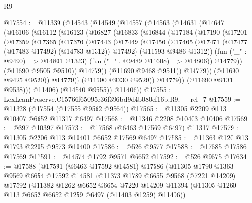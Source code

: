\begin{lexlean}{R9}
\begin{coremodule}
@17554 := @11339
    (@14543
      (@14549
        (@14557
          (@14563
            (@14631
              (@14647
                (@16106
                  (@16112
                    (@16123
                      (@16827
                        (@16833
                          (@16844
                            (@17184
                              (@17190
                                (@17201
                                  (@17359
                                    (@17365
                                      (@17376
                                        (@17443
                                          (@17449
                                            (@17456
                                              (@17465
                                                (@17471
                                                  (@17477 (@17483 @17492) (@14783 @1312))
                                                  @17492)
                                                (@11593 @9486 @1312))
                                              (fun ("_" : @9490) => @14801 @1323)
                                              (fun ("_" : @9489 @11608) => @14806))
                                            @14779))
                                        (@11690 @9505 @9510))
                                      @14779))
                                  (@11690 @9468 @9511))
                                @14779))
                            (@11690 @9425 @9520))
                          @14779))
                      (@11690 @9330 @9529))
                    @14779))
                (@11690 @9131 @9538)))
            @11406)
          (@14540 @9555))
        @11406))
@17555 := LexLeanPreserve.C15766f65095e36f396bd9d4b080ef16b.R9.__rel_7
@17559 := @11328 (@17554 (@17555 @9562 @9564))
@17565 := @11305 @2209 @113 @10407 @6652 @11317 @6497
@17568 := @11346 @2208 @10403 @10406
@17569 := @397 @10397
@17573 := @17568 (@6463 @17569 @6497) @11317
@17579 := @11305 @2206 @113 @10401 @6652 @17569 @6497
@17585 := @11363 @120 @13 @1793 @2205 @9573 @10400
@17586 := @526 @9577
@17588 := @17585 @17586 @17569
@17591 := @14574 @1792 @9571 @6652
@17592 := @526 @9575
@17634 := @17588
    (@17591
      (@6463 @17592 @14581)
      @17586
      (@11305
        @1790
        @1363
        @9569
        @6654
        @17592
        @14581
        (@11373
          @1789
          @6655
          @9568
          (@7221 @14209)
          @17592
          (@11382
            @1262
            @6652
            @6654
            @7220
            @14209
            @11394
            (@11305 @1260 @113 @6652 @6652 @1259 @6497 (@11403 @1259) @11406))

\end{coremodule}
\end{lexlean}
